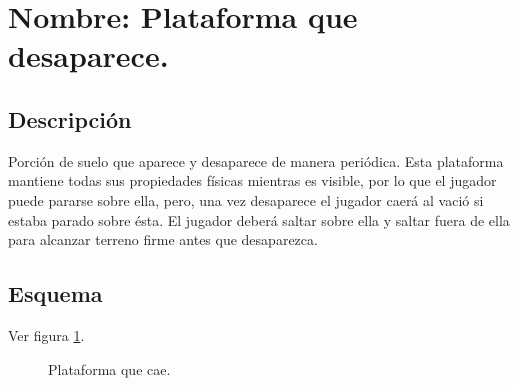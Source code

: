 \section{Nombre: Plataforma que desaparece.}\label{obs.PlatDes}
	\subsection{Descripción}
Porción de suelo que aparece y desaparece de manera periódica. Esta plataforma mantiene todas sus propiedades físicas mientras es visible, por lo que el jugador puede pararse sobre ella, pero, una vez desaparece el jugador caerá al vació si estaba parado sobre ésta. El jugador deberá saltar sobre ella y saltar fuera de ella para alcanzar terreno firme antes que desaparezca.  
	\subsection{Esquema}
Ver figura \ref{fig:plades}.
	\begin{figure}
  \centering
  \caption{Plataforma que cae.}
  \label{fig:plades}
\end{figure}